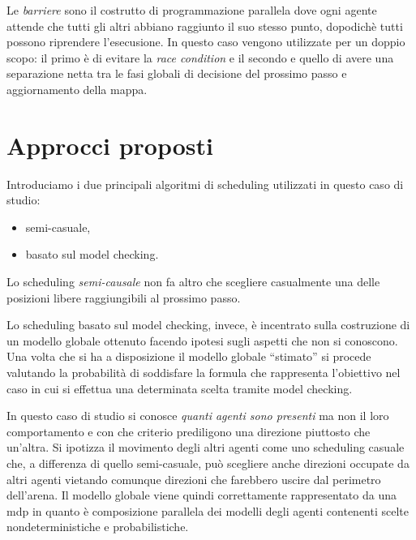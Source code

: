 Le \emph{barriere} sono il costrutto di programmazione parallela dove ogni agente attende che tutti gli altri abbiano raggiunto il suo stesso punto, dopodichè tutti possono riprendere l'esecusione. In questo caso vengono utilizzate per un doppio scopo: il primo è di evitare la \emph{race condition} e il secondo e quello di avere una separazione netta tra le fasi globali di decisione del prossimo passo e aggiornamento della mappa.

\section{Approcci proposti}
Introduciamo i due principali algoritmi di scheduling utilizzati in questo caso di studio:
\begin{itemize}
	\item semi-casuale,
	\item basato sul model checking.
\end{itemize}
Lo scheduling \emph{semi-causale} non fa altro che scegliere casualmente una delle posizioni libere raggiungibili al prossimo passo.

Lo scheduling basato sul model checking, invece, è incentrato sulla costruzione di un modello globale ottenuto facendo ipotesi sugli aspetti che non si conoscono. Una volta che si ha a disposizione il modello globale ``stimato'' si procede valutando la probabilità di soddisfare la formula che rappresenta l'obiettivo nel caso in cui si effettua una determinata scelta tramite model checking.

In questo caso di studio si conosce \emph{quanti agenti sono presenti} ma non il loro comportamento e con che criterio prediligono una direzione piuttosto che un'altra. Si ipotizza il movimento degli altri agenti come uno scheduling casuale che, a differenza di quello semi-casuale, può scegliere anche direzioni occupate da altri agenti vietando comunque direzioni che farebbero uscire dal perimetro dell'arena. Il modello globale viene quindi correttamente rappresentato da una \ac{mdp} in quanto è composizione parallela dei modelli degli agenti contenenti scelte nondeterministiche e probabilistiche.

